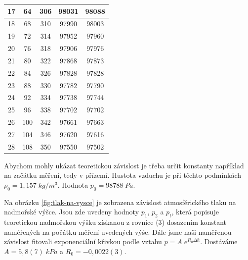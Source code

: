 \begin{table}[h]
\begin{tabular}{|c|c|c|c|c|}
17          & 64      & 306           & 98031 & 98088 \\ \hline
18          & 68      & 310           & 97990 & 98003 \\ \hline
19          & 72      & 314           & 97952 & 97960 \\ \hline
20          & 76      & 318           & 97906 & 97976 \\ \hline
21          & 80      & 322           & 97868 & 97873 \\ \hline
22          & 84      & 326           & 97828 & 97828 \\ \hline
23          & 88      & 330           & 97782 & 97790 \\ \hline
24          & 92      & 334           & 97738 & 97744 \\ \hline
25          & 96      & 338           & 97702 & 97702 \\ \hline
26          & 100     & 342           & 97661 & 97663 \\ \hline
27          & 104     & 346           & 97620 & 97616 \\ \hline
28          & 108     & 350           & 97550 & 97502 \\ \hline
\end{tabular}
\end{table}

\newpage

Abychom mohly ukázat teoretickou závislost je třeba určit konstanty například na začátku měření, tedy v přízemí. Hustota vzduchu je při těchto podmínkách $\rho_0 = 1,157 \; kg/m^3$. Hodnota $p_0 = 98 788 \; Pa$.

Na obrázku \ref{fig:tlak-na-vysce} je zobrazena závislost atmosférického tlaku na nadmořské výšce. Jsou zde uvedeny hodnoty $p_1$, $p_2$ a $p_t$, která popisuje teoretickou nadmořskou výšku získanou z rovnice (3) dosazením konstant naměřených na počátku měření uvedených výše. Dále jsme naši naměřenou závislost fitovali exponenciální křivkou podle vztahu $p = A \; e^{R_0 \Delta h}$. Dostáváme $A = 5,8(7) \; kPa$ a $R_0 = -0,0022(3)$.

